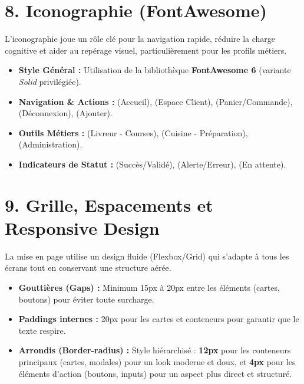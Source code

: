 \documentclass[12pt,a4paper]{article}
\begin{document}
\section{8. Iconographie (FontAwesome)}
L'iconographie joue un rôle clé pour la navigation rapide, réduire la charge cognitive et aider au repérage visuel, particulièrement pour les profils métiers.
\begin{itemize}[label=\textcolor{GrillRed}{\faChevronRight}]
    \item \textbf{Style Général :} Utilisation de la bibliothèque \textbf{FontAwesome 6} (variante \textit{Solid} privilégiée).
    \item \textbf{Navigation \& Actions :} \faHome (Accueil), \faUser (Espace Client), \faShoppingCart (Panier/Commande), \faSignOutAlt (Déconnexion), \faPlusCircle (Ajouter).
    \item \textbf{Outils Métiers :} \faMotorcycle (Livreur - Courses), \faFireBurner (Cuisine - Préparation), \faShieldAlt (Administration).
    \item \textbf{Indicateurs de Statut :} \faCheckCircle (Succès/Validé), \faExclamationTriangle (Alerte/Erreur), \faClock (En attente).
\end{itemize}

\section{9. Grille, Espacements et Responsive Design}
La mise en page utilise un design fluide (Flexbox/Grid) qui s'adapte à tous les écrans tout en conservant une structure aérée.

\begin{tcolorbox}[colback=SauceCream, colframe=CoalBlack!20, arc=2mm, title=\color{CoalBlack}\textbf{Règles d'Espacement (Marges \& Gouttières)}, fonttitle=\small, drop fuzzy shadow]
    \begin{itemize}[label=\textcolor{CoalBlack}{\tiny\faCircle}, itemsep=0pt]
        \item \textbf{Gouttières (Gaps) :} Minimum 15px à 20px entre les éléments (cartes, boutons) pour éviter toute surcharge.
        \item \textbf{Paddings internes :} 20px pour les cartes et conteneurs pour garantir que le texte respire.
        \item \textbf{Arrondis (Border-radius) :} Style hiérarchisé : \textbf{12px} pour les conteneurs principaux (cartes, modales) pour un look moderne et doux, et \textbf{4px} pour les éléments d'action (boutons, inputs) pour un aspect plus direct et structuré.
    \end{itemize}
\end{tcolorbox}
\end{document}
